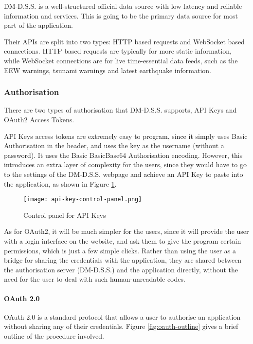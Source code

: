 DM-D.S.S. is a well-structured official data source with low latency and reliable information and services. This is going to be the primary data source for most part of the application.

Their APIs are split into two types: HTTP based requests and WebSocket based connections. HTTP based requests are typically for more static information, while WebSocket connections are for live time-essential data feeds, such as the EEW warnings, tsunami warnings and latest earthquake information.

\subsubsection{Authorisation}

There are two types of authorisation that DM-D.S.S. supports, API Keys and OAuth2 Access Tokens.

API Keys access tokens are extremely easy to program, since it simply uses Basic Authorisation in the header, and uses the key as the username (without a password). It uses the Basic BasicBase64 Authorisation encoding. However, this introduces an extra layer of complexity for the users, since they would have to go to the settings of the DM-D.S.S. webpage and achieve an API Key to paste into the application, as shown in Figure \ref{fig:api-key-control-panel}.

\begin{figure}[htp]
    \centering
    \texttt{[image: api-key-control-panel.png]}
    \caption{Control panel for API Keys}
    \label{fig:api-key-control-panel}
\end{figure}

As for OAuth2, it will be much simpler for the users, since it will provide the user with a login interface on the website, and ask them to give the program certain permissions, which is just a few simple clicks. Rather than using the user as a bridge for sharing the credentials with the application, they are shared between the authorisation server (DM-D.S.S.) and the application directly, without the need for the user to deal with such human-unreadable codes.

\paragraph{OAuth 2.0}

OAuth 2.0 is a standard protocol that allows a user to authorise an application without sharing any of their credentials. Figure \ref{fig:oauth-outline} gives a brief outline of the procedure involved.

